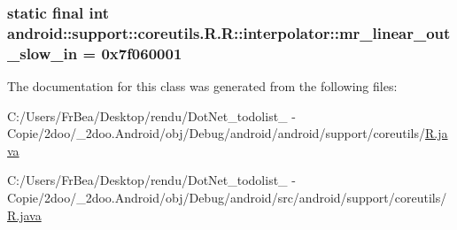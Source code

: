 \hypertarget{classandroid_1_1support_1_1coreutils_1_1_r_1_1interpolator_c38b664030a36dae601ce48a4efa2db4}{
\subsubsection[{mr\_\-linear\_\-out\_\-slow\_\-in}]{\setlength{\rightskip}{0pt plus 5cm}static final int android::support::coreutils.R.R::interpolator::mr\_\-linear\_\-out\_\-slow\_\-in = 0x7f060001}}
\label{classandroid_1_1support_1_1coreutils_1_1_r_1_1interpolator_c38b664030a36dae601ce48a4efa2db4}




The documentation for this class was generated from the following files:\begin{CompactItemize}
\item 
C:/Users/FrBea/Desktop/rendu/DotNet\_\-todolist\_ - Copie/2doo/\_\-2doo.Android/obj/Debug/android/android/support/coreutils/\hyperlink{android_2support_2coreutils_2_r_8java}{R.java}\item 
C:/Users/FrBea/Desktop/rendu/DotNet\_\-todolist\_ - Copie/2doo/\_\-2doo.Android/obj/Debug/android/src/android/support/coreutils/\hyperlink{src_2android_2support_2coreutils_2_r_8java}{R.java}\end{CompactItemize}
